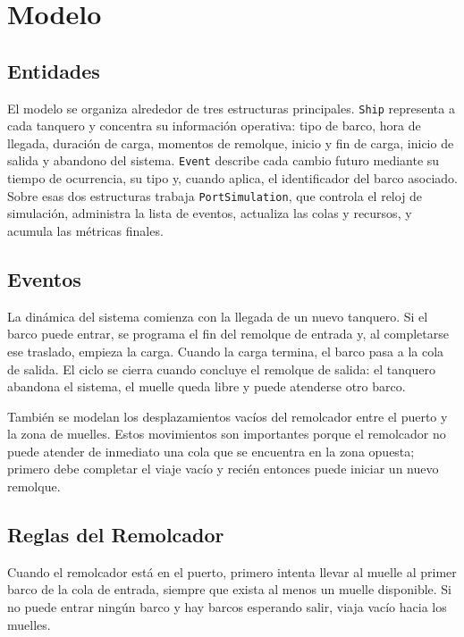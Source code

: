 \documentclass[12pt]{article}
\begin{document}
\section{Modelo}

\subsection{Entidades}

El modelo se organiza alrededor de tres estructuras principales. \texttt{Ship} representa a cada tanquero y concentra su información operativa: tipo de barco, hora de llegada, duración de carga, momentos de remolque, inicio y fin de carga, inicio de salida y abandono del sistema. \texttt{Event} describe cada cambio futuro mediante su tiempo de ocurrencia, su tipo y, cuando aplica, el identificador del barco asociado. Sobre esas dos estructuras trabaja \texttt{PortSimulation}, que controla el reloj de simulación, administra la lista de eventos, actualiza las colas y recursos, y acumula las métricas finales.

\subsection{Eventos}

La dinámica del sistema comienza con la llegada de un nuevo tanquero. Si el barco puede entrar, se programa el fin del remolque de entrada y, al completarse ese traslado, empieza la carga. Cuando la carga termina, el barco pasa a la cola de salida. El ciclo se cierra cuando concluye el remolque de salida: el tanquero abandona el sistema, el muelle queda libre y puede atenderse otro barco.

También se modelan los desplazamientos vacíos del remolcador entre el puerto y la zona de muelles. Estos movimientos son importantes porque el remolcador no puede atender de inmediato una cola que se encuentra en la zona opuesta; primero debe completar el viaje vacío y recién entonces puede iniciar un nuevo remolque.

\subsection{Reglas del Remolcador}

Cuando el remolcador está en el puerto, primero intenta llevar al muelle al primer barco de la cola de entrada, siempre que exista al menos un muelle disponible. Si no puede entrar ningún barco y hay barcos esperando salir, viaja vacío hacia los muelles.
\end{document}
